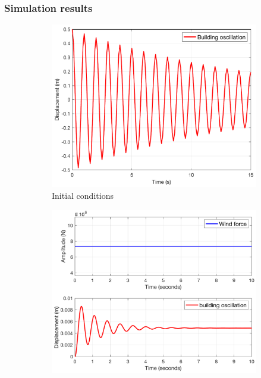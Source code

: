 \subsubsection{Simulation results}
\begin{figure}[H]
    \centering
    \begin{subfigure}{0.495\textwidth}
        \includegraphics[width=\textwidth]{resources/pdf/initial.pdf}
        \caption{Initial conditions}
        \label{fig:q4.initial}
    \end{subfigure}
    \begin{subfigure}{0.495\textwidth}
        \includegraphics[width=\textwidth]{resources/pdf/constant.pdf}

\end{subfigure}
\end{figure}
